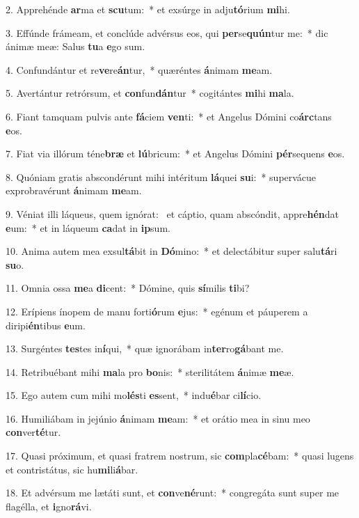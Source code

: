 2. Apprehénde \textbf{ar}ma et \textbf{scu}tum:~*  et exsúrge in adju\textbf{tó}rium \textbf{mi}hi.\

3. Effúnde frámeam, et conclúde advérsus eos, qui \textbf{per}se\textbf{quún}tur me:~*  dic ánimæ meæ: Salus \textbf{tu}a \textbf{e}go sum.\

4. Confundántur et re\textbf{ve}re\textbf{án}tur,~*  quæréntes \textbf{á}nimam \textbf{me}am.\

5. Avertántur retrórsum, et \textbf{con}fun\textbf{dán}tur~*  cogitántes \textbf{mi}hi \textbf{ma}la.\

6. Fiant tamquam pulvis ante \textbf{fá}ciem \textbf{ven}ti:~*  et Angelus Dómini co\textbf{árc}tans \textbf{e}os.\

7. Fiat via illórum téne\textbf{bræ} et \textbf{lú}bricum:~*  et Angelus Dómini \textbf{pér}sequens \textbf{e}os.\

8. Quóniam gratis abscondérunt mihi intéritum \textbf{lá}quei \textbf{su}i:~*  supervácue exprobravérunt \textbf{á}nimam \textbf{me}am.\

9. Véniat illi láqueus, quem ignórat: \dag\  et cáptio, quam abscóndit, appre\textbf{hén}dat \textbf{e}um:~*  et in láqueum \textbf{ca}dat in \textbf{ip}sum.\

10. Anima autem mea exsul\textbf{tá}bit in \textbf{Dó}mino:~*  et delectábitur super salu\textbf{tá}ri \textbf{su}o.\

11. Omnia ossa \textbf{me}a \textbf{di}cent:~*  Dómine, quis \textbf{sí}milis \textbf{ti}bi?\

12. Erípiens ínopem de manu forti\textbf{ó}rum \textbf{e}jus:~*  egénum et páuperem a diripi\textbf{én}tibus \textbf{e}um.\

13. Surgéntes \textbf{tes}tes in\textbf{í}qui,~*  quæ ignorábam in\textbf{ter}ro\textbf{gá}bant me.\

14. Retribuébant mihi \textbf{ma}la pro \textbf{bo}nis:~*  sterilitátem \textbf{á}nimæ \textbf{me}æ.\

15. Ego autem cum mihi mo\textbf{lés}ti \textbf{es}sent,~*  indu\textbf{é}bar ci\textbf{lí}cio.\

16. Humiliábam in jejúnio \textbf{á}nimam \textbf{me}am:~*  et orátio mea in sinu meo \textbf{con}ver\textbf{té}tur.\

17. Quasi próximum, et quasi fratrem nostrum, sic \textbf{com}pla\textbf{cé}bam:~*  quasi lugens et contristátus, sic hu\textbf{mi}li\textbf{á}bar.\

18. Et advérsum me lætáti sunt, et \textbf{con}ve\textbf{né}runt:~*  congregáta sunt super me flagélla, et \textbf{i}gno\textbf{rá}vi.\

